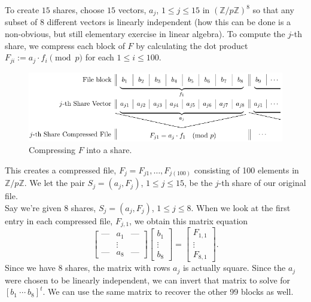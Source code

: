 \documentclass[11pt]{article}
\newcommand{\integers}{\mathbb{Z}}
\begin{document}
\noindent To create $15$ shares, choose $15$ vectors, $a_j$, $1\leq j\leq 15$ in $(\integers/p\integers)^8$ so that any subset of $8$ different vectors is linearly independent (how this can be done is a non-obvious, but still elementary exercise in linear algebra). To compute the $j$-th share, we compress each block of $F$ by calculating the dot product $F_{ji} := a_j\cdot f_i\pmod{p}$ for each $1\leq i\leq 100$.

\begin{figure}[h]
 	\centering
 		\includegraphics[scale=.7]{rabin_compression.png}
 	\caption{Compressing $F$ into a share.}
\end{figure}

\noindent This creates a compressed file, $F_j = F_{j1}, \ldots, F_{j(100)}$ consisting of 100 elements in $\integers/p\integers$. We let the pair $S_j = (a_j, F_j)$, $1\leq j\leq 15$, be the $j$-th share of our original file.\\

\noindent Say we're given 8 shares, $S_j = (a_j, F_j)$, $1\leq j\leq 8$. When we look at the first entry in each compressed file, $F_{j,1}$, we obtain this matrix equation
\[
\begin{bmatrix}
	\text{---} & a_1 & \text{---}\\
	&\vdots &\\
	\text{---} & a_8 & \text{---}
\end{bmatrix}
\begin{bmatrix}
	b_1\\
	\vdots\\
	b_8
\end{bmatrix} = 
\begin{bmatrix}
	F_{1,1}\\
	\vdots\\
	F_{8,1}
\end{bmatrix}.
\]
Since we have 8 shares, the matrix with rows $a_j$ is actually square. Since the $a_j$ were chosen to be linearly independent, we can invert that matrix to solve for $[b_1\ \cdots\ b_8]^t$. We can use the same matrix to recover the other 99 blocks as well. 
\end{document}
